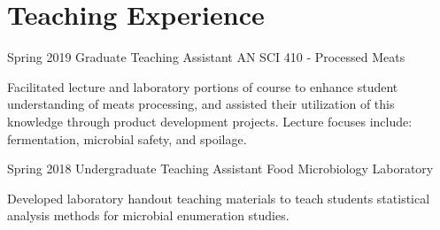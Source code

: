 \documentclass{tccv}
\begin{document}
\section{Teaching Experience}
\begin{eventlist}

\item{Spring 2019}
     {Graduate Teaching Assistant}
     {AN SCI 410 - Processed Meats}

Facilitated lecture and laboratory portions of course to enhance student understanding of meats processing, and assisted their utilization of this knowledge through product development projects. Lecture focuses include: fermentation, microbial safety, and spoilage.

\item{Spring 2018}
     {Undergraduate Teaching Assistant}
     {Food Microbiology Laboratory}


Developed laboratory handout teaching materials to teach students statistical analysis methods for microbial enumeration studies.
\end{eventlist}
\end{document}
